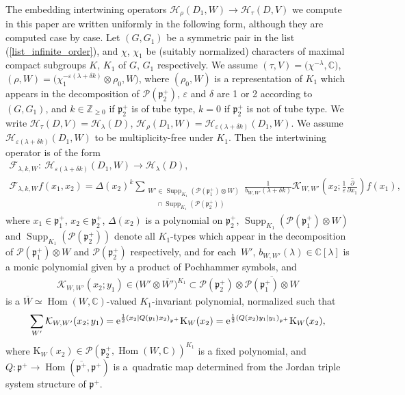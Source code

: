 \documentclass[pdftex]{sigma}
\numberwithin{equation}{section}
\newcommand{\BZ}{\mathbb{Z}}
\newcommand{\BC}{\mathbb{C}}
\newcommand{\fp}{\mathfrak{p}}
\newcommand{\cF}{\mathcal{F}}
\newcommand{\cH}{\mathcal{H}}
\newcommand{\cK}{\mathcal{K}}
\newcommand{\cP}{\mathcal{P}}
\newcommand{\rK}{\mathrm{K}}
\newcommand{\Hom}{\operatorname{Hom}}
\newcommand{\Supp}{\operatorname{Supp}}
\begin{document}
 The embedding intertwining operators $\cH_\rho(D_1,W)\rightarrow\cH_\tau(D,V)$ we compute in this paper are written uniformly
in the following form, although they are computed case by case. Let $(G,G_1)$ be a symmetric pair in the list (\ref{list_infinite_order}),
and $\chi$, $\chi_1$ be (suitably normalized) characters of maximal compact subgroups $K$, $K_1$ of $G$, $G_1$ respectively.
We assume $(\tau,V)=\big(\chi^{-\lambda},\BC\big)$, $(\rho,W)=\big(\chi_1^{-\varepsilon(\lambda+\delta k)}\otimes\rho_0,W\big)$,
where $(\rho_0,W)$ is a representation of $K_1$ which appears in the decomposition of $\cP(\fp^+_2)$, $\varepsilon$ and $\delta$ are
1 or 2 according to $(G,G_1)$, and $k\in\BZ_{\ge 0}$ if $\fp^+_2$ is of tube type, $k=0$ if $\fp^+_2$ is not of tube type.
We write $\cH_\tau(D,V)=\cH_\lambda(D)$, $\cH_\rho(D_1,W)=\cH_{\varepsilon(\lambda+\delta k)}(D_1,W)$.
We assume $\cH_{\varepsilon(\lambda+\delta k)}(D_1,W)$ to be multiplicity-free under $K_1$.
Then the intertwining operator is of the form
\begin{gather*}
\cF_{\lambda,k,W}\colon \ \cH_{\varepsilon(\lambda+\delta k)}(D_1,W)\to\cH_\lambda(D), \\
\cF_{\lambda,k,W}f(x_1,x_2)=\Delta(x_2)^k\sum_{\substack{W'\in\Supp_{K_1}(\cP(\fp^+_1)\otimes W) \\ \hspace{15pt}\cap\Supp_{K_1}(\cP(\fp^+_2))}}
\frac{1}{b_{W,W'}(\lambda+\delta k)}
\cK_{W,W'}\left(x_2;\frac{1}{\varepsilon}\overline{\frac{\partial}{\partial x_1}}\right)f(x_1),
\end{gather*}
where $x_1\in\fp^+_1$, $x_2\in\fp^+_2$, $\Delta(x_2)$ is a polynomial on $\fp^+_2$, $\Supp_{K_1}(\cP(\fp^+_1)\otimes W)$ and $\Supp_{K_1}(\cP(\fp^+_2))$ denote all $K_1$-types which appear in the decomposition of $\cP(\fp^+_1)\otimes W$ and $\cP(\fp^+_2)$ respectively, and for each~$W'$, $b_{W,W'}(\lambda)\in\BC[\lambda]$ is a monic polynomial given by a product of Pochhammer symbols, and
\begin{gather*} \cK_{W,W'}(x_2;y_1)\in \big(W'\otimes \overline{W'}\big)^{K_1}\subset \cP(\fp^+_2)\otimes\overline{\cP(\fp^+_1)\otimes W} \end{gather*}
is a $\overline{W}\simeq\Hom(W,\BC)$-valued $K_1$-invariant polynomial, normalized such that
\begin{gather*} \sum_{W'}\cK_{W,W'}(x_2;y_1)={\rm e}^{\frac{1}{2}(x_2|Q(y_1)x_2)_{\fp^+}}\rK_{W}(x_2)
={\rm e}^{\frac{1}{2}(Q(x_2)y_1|y_1)_{\fp^+}}\rK_W(x_2), \end{gather*}
where $\rK_W(x_2)\in\cP(\fp^+_2,\Hom(W,\BC))^{K_1}$ is a fixed polynomial, and $Q\colon \fp^+\to\Hom(\overline{\fp^+},\fp^+)$ is a~quadratic map determined from the Jordan triple system structure of $\fp^+$.
\end{document}
